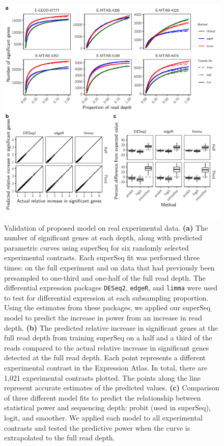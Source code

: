 \documentclass[11pt]{article}
\begin{document}
\begin{figure}[!ht]
\includegraphics[width = \textwidth]{../analysis/figures/figure2.png}
\centering
\caption{Validation of proposed model on real experimental data. \textbf{(a)} The number of significant genes at each depth, along with predicted parametric curves using superSeq for six randomly selected experimental contrasts. Each superSeq fit was performed three times: on the full experiment and on data that had previously been presampled to one-third and one-half of the full read depth. The differential expression packages {\tt DESeq2}, {\tt edgeR}, and {\tt limma} were used to test for differential expression at each subsampling proportion. Using the estimates from these packages, we applied our superSeq model to predict the increase in power from an increase in read depth. \textbf{(b)} The predicted relative increase in significant genes at the full read depth from training superSeq on a half and a third of the reads compared to the actual relative increase in significant genes detected at the full read depth. Each point represents a different experimental contrast in the Expression Atlas. In total, there are 1,021 experimental contrasts plotted. The points along the line represent accurate estimates of the predicted values. \textbf{(c)} Comparison of three different model fits to predict the relationship between statistical power and sequencing depth: probit (used in superSeq), logit, and smoother. We applied each model to all experimental contrasts and tested the predictive power when the curve is extrapolated to the full read depth.}
\label{fig:fig2}
\end{figure}
\FloatBarrier
\end{document}
